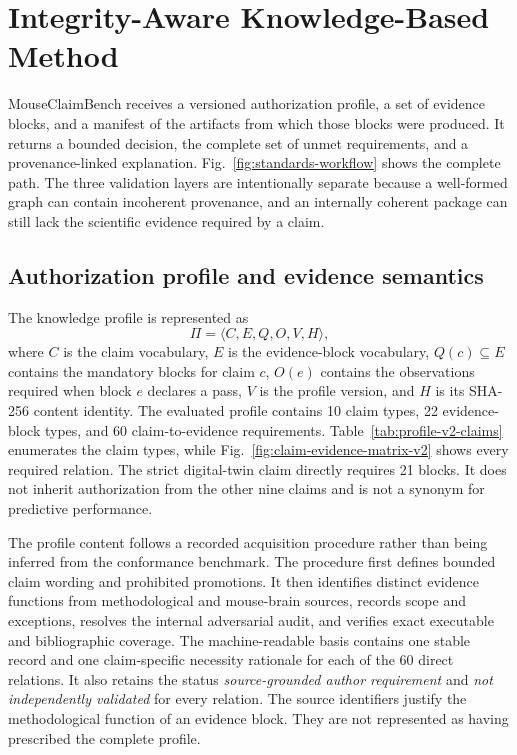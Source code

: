 \section{Integrity-Aware Knowledge-Based Method}
\label{sec:method}

MouseClaimBench receives a versioned authorization profile, a set of evidence blocks, and a manifest of the artifacts from which those blocks were produced. It returns a bounded decision, the complete set of unmet requirements, and a provenance-linked explanation. Fig.~\ref{fig:standards-workflow} shows the complete path. The three validation layers are intentionally separate because a well-formed graph can contain incoherent provenance, and an internally coherent package can still lack the scientific evidence required by a claim.



\subsection{Authorization profile and evidence semantics}
\label{subsec:authorization-semantics}

The knowledge profile is represented as
\begin{equation}
\Pi=\langle C,E,Q,O,V,H\rangle,
\label{eq:profile-v2}
\end{equation}
where $C$ is the claim vocabulary, $E$ is the evidence-block vocabulary, $Q(c)\subseteq E$ contains the mandatory blocks for claim $c$, $O(e)$ contains the observations required when block $e$ declares a pass, $V$ is the profile version, and $H$ is its SHA-256 content identity. The evaluated profile contains 10 claim types, 22 evidence-block types, and 60 claim-to-evidence requirements. Table~\ref{tab:profile-v2-claims} enumerates the claim types, while Fig.~\ref{fig:claim-evidence-matrix-v2} shows every required relation. The strict digital-twin claim directly requires 21 blocks. It does not inherit authorization from the other nine claims and is not a synonym for predictive performance.




The profile content follows a recorded acquisition procedure rather than being inferred from the conformance benchmark. The procedure first defines bounded claim wording and prohibited promotions. It then identifies distinct evidence functions from methodological and mouse-brain sources, records scope and exceptions, resolves the internal adversarial audit, and verifies exact executable and bibliographic coverage. The machine-readable basis contains one stable record and one claim-specific necessity rationale for each of the 60 direct relations. It also retains the status \emph{source-grounded author requirement} and \emph{not independently validated} for every relation. The source identifiers justify the methodological function of an evidence block. They are not represented as having prescribed the complete profile.


